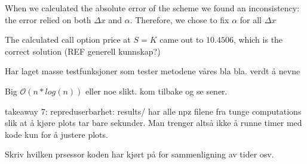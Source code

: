 
When we calculated the absolute error of the scheme we found an inconsistency: the error relied on both $\Delta x$ and $\alpha$. Therefore, we chose to fix $\alpha$ for all $\Delta x$ 


The calculated call option price at $S = K$ came out to $10.4506$, which is the correct solution (REF generell kunnskap?)


Har laget masse testfunksjoner som tester metodene våres bla bla. verdt å nevne


Big $\mathcal{O}
(n*log(n))$ eller noe slikt. kom tilbake og se sener.


takeaway 7: repreduserbarhet: results/ har alle npz filene fra tunge computations slik at å kjøre plots tar bare sekunder. Man trenger altså ikke å runne timer med kode kun for å justere plots. 

Skriv hvilken prsessor koden har kjørt på for sammenligning av tider osv. 

